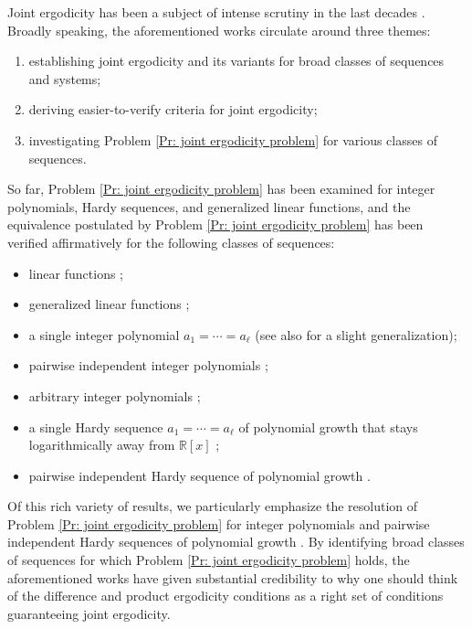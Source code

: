 \documentclass[11pt]{amsart}
\theoremstyle{definition}
\newcommand{\R}{{\mathbb R}}
\newcommand{\1}{{\mathbf{1}}}
\begin{document}
Joint ergodicity has been a subject of intense scrutiny in the last decades \cite{BB84, BB86, Ber87, BeHK09, BLS16, BMR20, BS22, BS23, BFM22, CFH11, DFKS22, DKKST24, DKS22, DKS23, DKS24,  Fr10, Fr12, Fr22, Fr21, FrKr05, FrKu22b, FrKu22c, FrKu22a, KK19, Kouts21,  KoSu23, KoTs23, Ts22}. Broadly speaking, the aforementioned works circulate around three themes:
\begin{enumerate}
    \item establishing joint ergodicity and its variants for broad classes of sequences and systems;
    \item deriving easier-to-verify criteria for joint ergodicity;
    \item investigating Problem \ref{Pr: joint ergodicity problem} for various classes of sequences.
\end{enumerate}

So far, Problem \ref{Pr: joint ergodicity problem} has been examined for integer polynomials, Hardy sequences, and generalized linear functions, and the equivalence postulated by Problem \ref{Pr: joint ergodicity problem} has been verified affirmatively for the following classes of sequences:
\begin{itemize}
    \item linear functions \cite{BB84};
    \item generalized linear functions \cite{BLS16};
    \item a single integer polynomial $a_1 = \cdots = a_\ell$ \cite{DKS22} (see also \cite{DFKS22} for a slight generalization);
    \item pairwise independent integer polynomials \cite{FrKu22a};
    \item arbitrary integer polynomials \cite{FrKu22b};
    \item a single Hardy sequence $a_1 = \cdots = a_\ell$ of polynomial growth that stays logarithmically away from $\R[x]$ \cite{DKS23};
    \item pairwise independent Hardy sequence of polynomial growth \cite{DKKST24}.
\end{itemize}
Of this rich variety of results, we particularly emphasize the resolution of Problem \ref{Pr: joint ergodicity problem} for integer polynomials \cite{FrKu22b} and pairwise independent Hardy sequences of polynomial growth \cite{DKKST24}. By identifying broad classes of sequences for which Problem \ref{Pr: joint ergodicity problem} holds, the aforementioned works have given substantial credibility to why one should think of the difference and product ergodicity conditions as a right set of conditions guaranteeing joint ergodicity. 
\end{document}
